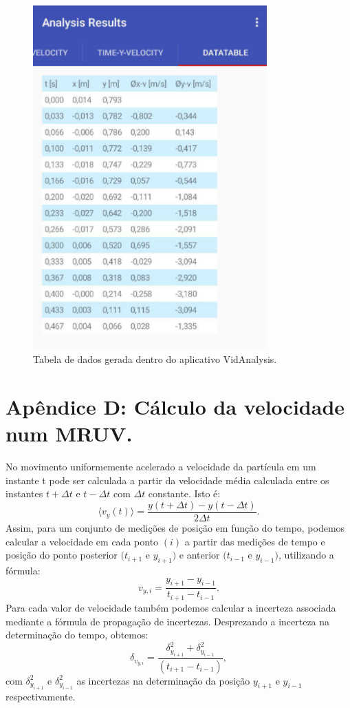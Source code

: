 \documentclass[12pt]{article}
\newcommand{\beq}{\begin{equation}}
\newcommand{\eeq}{\end{equation}}
\begin{document}
\begin{figure}[h!]
\includegraphics[width=9cm]{imagenapendicec5.pdf}
\caption{Tabela de dados gerada dentro do aplicativo VidAnalysis.}
\label{apendice5c}
\end{figure}
 \clearpage
\section{Apêndice D: Cálculo da velocidade num MRUV.}
\label{ApendiceD}
\indent 

No movimento uniformemente acelerado a velocidade da partícula em um instante t pode ser calculada a partir da velocidade média calculada entre os instantes $t+\Delta t$ e $t-\Delta t$ 
com $\Delta t$ constante. Isto é:
\beq
\langle v_y(t) \rangle=\frac{y(t+\Delta t)-y(t-\Delta t)}{2\Delta t}.
\eeq
Assim, para um conjunto de medições de posição em função do tempo, podemos calcular a velocidade em cada ponto $(i)$ a partir das medições de tempo e posição do ponto posterior
$(t_{i+1}$ e $y_{i+1})$ e anterior $(t_{i-1}$ e $y_{i-1})$, utilizando a fórmula:
\beq
v_{y,i}=\frac{y_{i+1}-y_{i-1}}{t_{i+1}-t_{i-1}}.
\eeq
Para cada valor de velocidade também podemos calcular a incerteza associada mediante a fórmula de propagação de incertezas. Desprezando a incerteza na determinação do tempo, obtemos:
\beq
\delta_{v_{y,i}}=\frac{\delta^2_{y_{i+1}}+\delta^2_{y_{i-1}}}{(t_{i+1}-t_{i-1})},
\eeq
com $\delta^2_{y_{i+1}}$ e $\delta^2_{y_{i-1}}$ as incertezas na determinação da posição $y_{i+1}$
e $y_{i-1}$ respectivamente.
\end{document}
